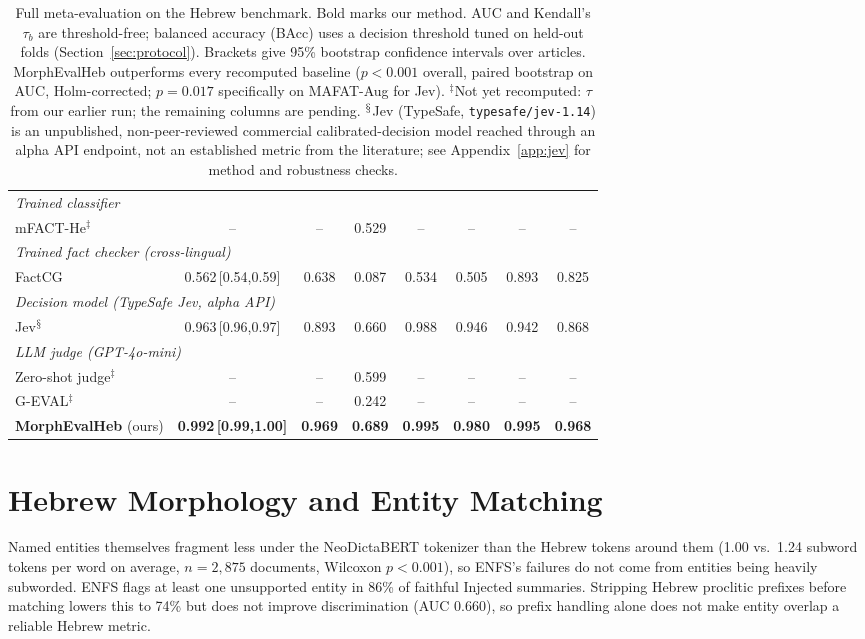 \documentclass[11pt]{article}
\begin{document}
\begin{table}[t]
\begin{tabular}{lccc|cc|cc}
\multicolumn{8}{l}{\textit{Trained classifier}} \\
mFACT-He$^{\ddagger}$ & -- & -- & 0.529 & -- & -- & -- & -- \\
\multicolumn{8}{l}{\textit{Trained fact checker (cross-lingual)}} \\
FactCG & 0.562\,{\scriptsize[0.54,0.59]} & 0.638 & 0.087 & 0.534 & 0.505 & 0.893 & 0.825 \\
\multicolumn{8}{l}{\textit{Decision model (TypeSafe Jev, alpha API)}} \\
Jev$^{\mathsection}$ & 0.963\,{\scriptsize[0.96,0.97]} & 0.893 & 0.660 & 0.988 & 0.946 & 0.942 & 0.868 \\
\multicolumn{8}{l}{\textit{LLM judge (GPT-4o-mini)}} \\
Zero-shot judge$^{\ddagger}$ & -- & -- & 0.599 & -- & -- & -- & -- \\
G-EVAL$^{\ddagger}$ & -- & -- & 0.242 & -- & -- & -- & -- \\
\midrule
\textbf{MorphEvalHeb} (ours) & \textbf{0.992\,{\scriptsize[0.99,1.00]}} & \textbf{0.969} & \textbf{0.689} & \textbf{0.995} & \textbf{0.980} & \textbf{0.995} & \textbf{0.968} \\
\bottomrule
\end{tabular}
\caption{Full meta-evaluation on the Hebrew benchmark. Bold marks our method. AUC and Kendall's $\tau_b$ are threshold-free; balanced accuracy (BAcc) uses a decision threshold tuned on held-out folds (Section~\ref{sec:protocol}). Brackets give 95\% bootstrap confidence intervals over articles. MorphEvalHeb outperforms every recomputed baseline ($p<0.001$ overall, paired bootstrap on AUC, Holm-corrected; $p=0.017$ specifically on MAFAT-Aug for Jev). $^{\ddagger}$Not yet recomputed: $\tau$ from our earlier run; the remaining columns are pending. $^{\mathsection}$Jev (TypeSafe, \texttt{typesafe/jev-1.14}) is an unpublished, non-peer-reviewed commercial calibrated-decision model reached through an alpha API endpoint, not an established metric from the literature; see Appendix~\ref{app:jev} for method and robustness checks.}
\label{tab:full_results}
\end{table}




\section{Hebrew Morphology and Entity Matching}
\label{app:enfs}
Named entities themselves fragment less under the NeoDictaBERT tokenizer than the Hebrew tokens around them (1.00 vs.\ 1.24 subword tokens per word on average, $n{=}2{,}875$ documents, Wilcoxon $p<0.001$), so ENFS's failures do not come from entities being heavily subworded. ENFS flags at least one unsupported entity in 86\% of faithful Injected summaries. Stripping Hebrew proclitic prefixes before matching lowers this to 74\% but does not improve discrimination (AUC 0.660), so prefix handling alone does not make entity overlap a reliable Hebrew metric.
\end{document}
